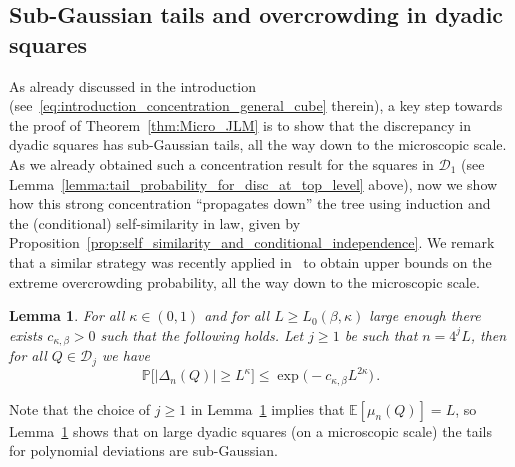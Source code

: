 \documentclass[11pt]{amsart}
\newtheorem{lemma}[theorem]{Lemma}
\theoremstyle{definition}
\theoremstyle{remark}
\numberwithin{equation}{section}
\newcommand{\bP}{\mathbb P}
\newcommand{\bE}{\mathbb E}
\begin{document}
	\subsection{Sub-Gaussian tails and overcrowding in dyadic squares}
	As already discussed in the introduction (see~\eqref{eq:introduction_concentration_general_cube} therein), a key step towards the proof of Theorem~\ref{thm:Micro_JLM} is to show that the discrepancy in dyadic squares has sub-Gaussian tails, all the way down to the microscopic scale. As we already obtained such a concentration result for the squares in $\mathcal{D}_1$ (see Lemma~\ref{lemma:tail_probability_for_disc_at_top_level} above), now we show how this strong concentration ``propagates down'' the tree using induction and the (conditional) self-similarity in law, given by Proposition~\ref{prop:self_similarity_and_conditional_independence}. We remark that a similar strategy was recently applied in~\cite[Proposition 2.2]{Thoma} to obtain upper bounds on the extreme overcrowding probability, all the way down to the microscopic scale.
	\begin{lemma}
		\label{lemma:concentration_on_dyadic_cubes}
		For all $\kappa\in(0,1)$ and for all $L\ge L_0(\beta,\kappa)$ large enough there exists $c_{\kappa,\beta}>0$ such that the following holds. Let $j\ge 1$ be such that $n = 4^j L$, then for all $Q\in \mathcal{D}_j$ we have 
		\[
		\bP\big[|\Delta_n(Q)| \ge L^\kappa\big] \le \exp\Big(-c_{\kappa,\beta} L^{2\kappa}\Big) \, .
		\]
	\end{lemma}
	Note that the choice of $j\ge 1$ in Lemma~\ref{lemma:concentration_on_dyadic_cubes} implies that $\bE[\mu_n(Q)] = L$, so Lemma~\ref{lemma:concentration_on_dyadic_cubes} shows that on large dyadic squares (on a microscopic scale) the tails for polynomial deviations are sub-Gaussian.
\end{document}
